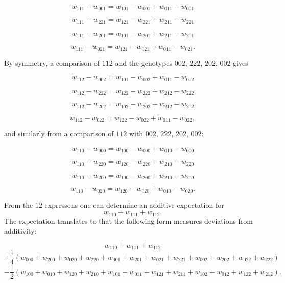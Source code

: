 \documentclass[12pt]{amsart}
\theoremstyle{plain}
\theoremstyle{definition}
\begin{document}
\[
w_{111}-w_{001}=w_{101}-w_{001} +  w_{011} - w_{001}
\]



\[
w_{111}-w_{221}=w_{121}-w_{221} +  w_{211} -w_{221}
\]



\[
w_{111}-w_{201}=w_{101}-w_{201}+ w_{211} -w_{201}
\]



\[
w_{111}-w_{021}=w_{121}-w_{021}+ w_{011} - w_{021}.
\]


\bigskip
By symmetry, a comparison of  $112$ 
and the genotypes $002$, $222$, $202$, $002$ 
gives


\[
w_{112}-w_{002}=w_{101}-w_{002} +  w_{011} -w_{002}
\]



\[
w_{112}-w_{222}=w_{122}-w_{222} +  w_{212} -w_{222}
\]



\[
w_{112}-w_{202}=w_{102}-w_{202}+ w_{212} -w_{202}
\]



\[
w_{112}-w_{022}=w_{122}-w_{022}+ w_{011} - w_{022},
\]




\bigskip
and  similarly from a comparison of  $112$ with $002$, $222$, $202$, $002$:

\[
w_{110}-w_{000}=w_{100}-w_{000} +  w_{010} -w_{000}
\]



\[
w_{110}-w_{220}=w_{120} - w_{220} +  w_{210} -w_{220}
\]



\[
w_{110}-w_{200}=w_{100}-w_{200}+ w_{210} -w_{200}
\]



\[
w_{110}-w_{020}=w_{120}-w_{020}+ w_{010} - w_{020}.
\]






From the 12 expressons one can 
determine an additive expectation for
\[
w_{110} + w_{111} +w_{112}.
\]
The expectation translates
to that the following form
measures deviations from
additivity:






\[
w_{110} + w_{111} +w_{112}
\]
\[
+\frac{1}{4} \left(w_{000}+w_{200}+w_{020}+ w_{220}+ w_{001} + w_{201} + w_{021}+  w_{221} + w_{002} + w_{202}+ w_{022} + w_{222}  \right)
\]
\[
-\frac{1}{2} ( w_{100} + w_{010} + w_{120}+w_{210} +w_{101} + w_{011} + w_{121}+w_{211}+ w_{102} + w_{012} + w_{122}+w_{212}).
\]
\end{document}
